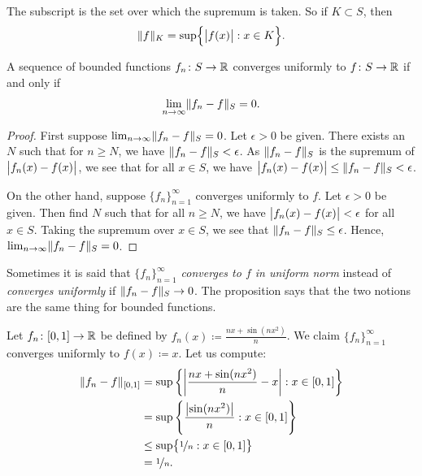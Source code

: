 The subscript is the set over which the supremum is taken.
So if $K \subset S$, then
\begin{equation*}
\lVert {f} \rVert_K =
\sup \Bigl\{ \bigl\lvert {f(x)} \bigr\rvert : x \in K \Bigr\} .
\end{equation*}

\begin{prop}
A sequence of bounded functions $f_n \colon S \to {\mathbb{R}}$ converges
uniformly to $f \colon S \to {\mathbb{R}}$ if and only if
\begin{equation*}
\lim_{n\to\infty} \lVert {f_n - f} \rVert_S = 0 .
\end{equation*}
\end{prop}

\begin{proof}
First suppose 
$\lim_{n\to\infty} \lVert {f_n - f} \rVert_S = 0$.  Let $\epsilon > 0$ be
given.  There exists an $N$ such that
for $n \geq N$, we have $\lVert {f_n - f} \rVert_S < \epsilon$.  As $\lVert {f_n-f} \rVert_S$
is the supremum of $\bigl\lvert {f_n(x)-f(x)} \bigr\rvert$, we see that for all $x \in S$,
we have $\bigl\lvert {f_n(x)-f(x)} \bigr\rvert \leq \lVert {f_n - f} \rVert_S < \epsilon$.

On the other hand, suppose $\{ f_n \}_{n=1}^\infty$ converges uniformly to $f$.
Let $\epsilon > 0$ be given.  Then find $N$ such that 
for all $n \geq N$, we have
$\bigl\lvert {f_n(x)-f(x)} \bigr\rvert < \epsilon$ for all $x \in S$.
Taking the supremum over $x \in S$, we see that
$\lVert {f_n - f} \rVert_S \leq \epsilon$.  Hence, $\lim_{n\to\infty} \lVert {f_n-f} \rVert_S = 0$.
\end{proof}

Sometimes it is said that
\emph{$\{ f_n \}_{n=1}^\infty$ converges to $f$ in uniform norm}%
instead of \emph{converges uniformly} if $\lVert {f_n-f} \rVert_S \to 0$.  The proposition
says that the two notions are the same thing for bounded functions.

\begin{example}
Let $f_n \colon [0,1] \to {\mathbb{R}}$ be defined by $f_n(x) \coloneqq \frac{nx+ \sin(nx^2)}{n}$.
We claim $\{ f_n \}_{n=1}^\infty$ converges uniformly to $f(x) \coloneqq x$.  Let us compute:
\begin{equation*}
\begin{split}
\lVert {f_n-f} \rVert_{[0,1]}
& =
\sup \left\{ \left\lvert {\frac{nx+ \sin(nx^2)}{n} - x} \right\rvert : x \in [0,1] \right\}
\\
& =
\sup \left\{ \frac{\bigl\lvert {\sin(nx^2)} \bigr\rvert}{n} : x \in [0,1] \right\}
\\
& \leq
\sup \bigl\{ \nicefrac{1}{n} : x \in [0,1] \bigr\}
\\
& = \nicefrac{1}{n}.
\end{split}
\end{equation*}
\end{example}

